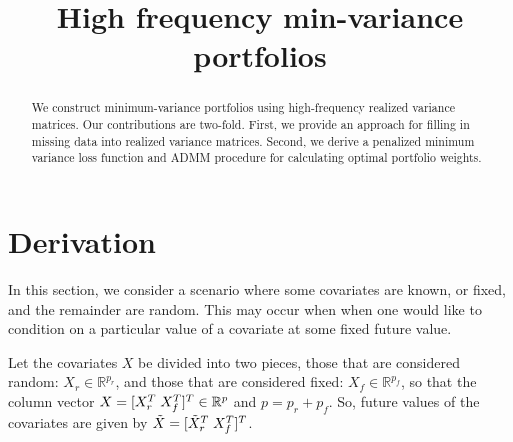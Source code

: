 \documentclass[ba]{imsart}
\begin{document}
\begin{frontmatter}
\title{High frequency min-variance portfolios}


%
\begin{abstract}
We construct minimum-variance portfolios using high-frequency realized variance matrices. Our contributions are two-fold. First, we provide an approach for filling in missing data into realized variance matrices.  Second, we derive a penalized minimum variance loss function and ADMM procedure for calculating optimal portfolio weights.
\end{abstract}

%

\end{frontmatter}

\section{Derivation}
In this section, we consider a scenario where some covariates are known, or fixed, and the remainder are random.   This may occur when when one would like to condition on a particular value of a covariate at some fixed future value.
     
 Let the covariates $X$ be divided into two pieces, those that are considered random: $X_{r} \in \mathbb{R}^{p_{r}}$, and those that are considered fixed: $X_{f} \in \mathbb{R}^{p_{f}}$, so that the column vector $X = [X_{r}^{T} \hspace{1mm} X_{f}^{T}]^{T} \in \mathbb{R}^{p}$ and $p = p_{r} + p_{f}$.  So, future values of the covariates are given by $\tilde{X} = [\tilde{X}_{r}^{T} \hspace{1mm} X_{f}^{T}]^{T}$.
\end{document}
